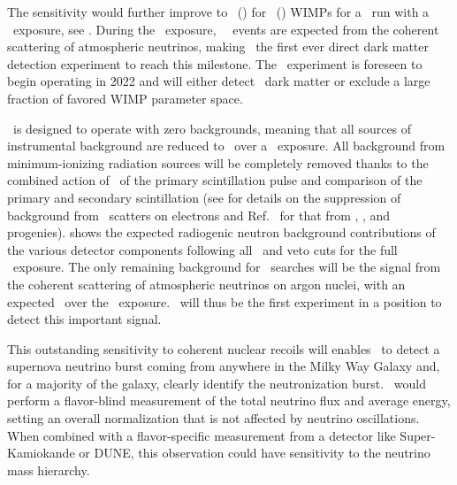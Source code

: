The sensitivity would further improve to \DSkExtendedSensitivityOneGeVUnit\ (\DSkExtendedSensitivityTenGeVUnit) for \WIMPMassOneTev\ (\WIMPMassTenTev) WIMPs for a \DSkExtendedRunTimePlannedVerbal\ run with a \DSkExtendedExposure\ exposure, see .  During the \DSkExtendedExposure\ exposure, \DSkNuInducedBackgroundExtendedExposureBare\ \NRs\ events are expected from the coherent scattering of atmospheric neutrinos, making \DSks\ the first ever direct dark matter detection experiment to reach this milestone.  The \DSks\ experiment is foreseen to begin operating in 2022 and will either detect \WIMP\ dark matter or exclude a large fraction of favored WIMP parameter space.

\DSks\ is designed to operate with zero backgrounds, meaning that all sources of instrumental background are reduced to \BackgroundFreeRequirement\ over a \DSkExtendedExposure\ exposure.  All background from minimum-ionizing radiation sources will be completely removed thanks to the combined action of \PSD\ of the primary scintillation pulse and comparison of the primary and secondary scintillation (see  for details on the suppression of background from \PP\ scatters on electrons and Ref.~\cite{Aalseth:2018gq} for that from , , and progenies).   shows the expected radiogenic neutron background contributions of the various detector components following all \TPC\ and veto cuts for the full \DSks\ exposure.  The only remaining background for \WIMP\ searches will be the signal from the coherent scattering of atmospheric neutrinos on argon nuclei, with an expected \DSkNuInducedBackgroundExtendedExposureUnit\ over the \DSkExtendedExposure\ exposure.  \DSks\ will thus be the first experiment in a position to detect this important signal.

This outstanding sensitivity to coherent nuclear recoils will enables \DSks\ to detect a supernova neutrino burst coming from anywhere in the Milky Way Galaxy and, for a majority of the galaxy, clearly identify the neutronization burst. \DSks\ would perform a flavor-blind measurement of the total neutrino flux and average energy, setting an overall normalization that is not affected by neutrino oscillations. When combined with a flavor-specific measurement from a detector like Super-Kamiokande or DUNE, this observation could have sensitivity to the neutrino mass hierarchy. 

